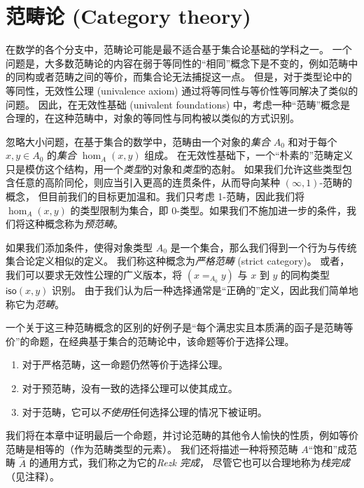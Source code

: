 \chapter{范畴论 (Category theory)}
\label{cha:category-theory}

在数学的各个分支中，范畴论可能是最不适合基于集合论基础的学科之一。
一个问题是，大多数范畴论的内容在弱于等同性的“相同”概念下是不变的，例如范畴中的同构或者范畴之间的等价，而集合论无法捕捉这一点。
但是，对于类型论中的等同性，无效性公理 (univalence axiom) 通过将等同性与等价性等同解决了类似的问题。
因此，在无效性基础 (univalent foundations) 中，考虑一种“范畴”概念是合理的，在这种范畴中，对象的等同性与同构被以类似的方式识别。

忽略大小问题，在基于集合的数学中，范畴由一个对象的\emph{集合} $A_0$ 和对于每个 $x,y\in A_0$ 的\emph{集合} $\hom_A(x,y)$ 组成。
在无效性基础下，一个“朴素的”范畴定义只是模仿这个结构，用一个\emph{类型}的对象和\emph{类型}的态射。
如果我们允许这些类型包含任意的高阶同伦，则应当引入更高的连贯条件，从而导向某种 $(\infty,1)$-范畴的概念，%
但目前我们的目标更加温和。我们只考虑 1-范畴，因此我们将 $\hom_A(x,y)$ 的类型限制为集合，即 0-类型。如果我们不施加进一步的条件，我们将这种概念称为\emph{预范畴}。

如果我们添加条件，使得对象类型 $A_0$ 是一个集合，那么我们得到一个行为与传统集合论定义相似的定义。
我们称这种概念为\emph{严格范畴} (strict category)。
%
或者，我们可以要求无效性公理的广义版本，将 $(x=_{A_0} y)$ 与 $x$ 到 $y$ 的同构类型 $\mathsf{iso}(x,y)$ 识别。
由于我们认为后一种选择通常是“正确的”定义，因此我们简单地称它为\emph{范畴}。

一个关于这三种范畴概念的区别的好例子是“每个满忠实且本质满的函子是范畴等价”的命题，在经典基于集合的范畴论中，该命题等价于选择公理。
%
%
%
\begin{enumerate}
  \item 对于严格范畴，这一命题仍然等价于选择公理。
  \item 对于预范畴，没有一致的选择公理可以使其成立。
  \item 对于范畴，它可以\emph{不使用}任何选择公理的情况下被证明。
\end{enumerate}
我们将在本章中证明最后一个命题，并讨论范畴的其他令人愉快的性质，例如等价范畴是相等的（作为范畴类型的元素）。
我们还将描述一种将预范畴 $A$“饱和”成范畴 $\widehat A$ 的通用方式，我们称之为它的\emph{Rezk 完成}，%
尽管它也可以合理地称为\emph{栈完成}（见注释）。

